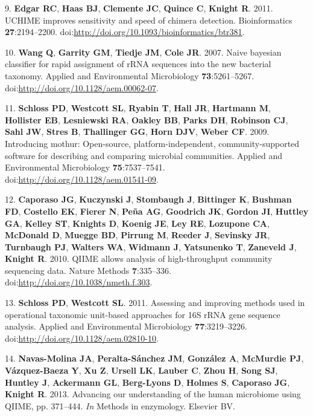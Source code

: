 \documentclass[11pt,]{article}
\begin{document}
9. \textbf{Edgar RC}, \textbf{Haas BJ}, \textbf{Clemente JC},
\textbf{Quince C}, \textbf{Knight R}. 2011. UCHIME improves sensitivity
and speed of chimera detection. Bioinformatics \textbf{27}:2194--2200.
doi:\url{http://doi.org/10.1093/bioinformatics/btr381}.

10. \textbf{Wang Q}, \textbf{Garrity GM}, \textbf{Tiedje JM},
\textbf{Cole JR}. 2007. Naive bayesian classifier for rapid assignment
of rRNA sequences into the new bacterial taxonomy. Applied and
Environmental Microbiology \textbf{73}:5261--5267.
doi:\url{http://doi.org/10.1128/aem.00062-07}.

11. \textbf{Schloss PD}, \textbf{Westcott SL}, \textbf{Ryabin T},
\textbf{Hall JR}, \textbf{Hartmann M}, \textbf{Hollister EB},
\textbf{Lesniewski RA}, \textbf{Oakley BB}, \textbf{Parks DH},
\textbf{Robinson CJ}, \textbf{Sahl JW}, \textbf{Stres B},
\textbf{Thallinger GG}, \textbf{Horn DJV}, \textbf{Weber CF}. 2009.
Introducing mothur: Open-source, platform-independent,
community-supported software for describing and comparing microbial
communities. Applied and Environmental Microbiology
\textbf{75}:7537--7541. doi:\url{http://doi.org/10.1128/aem.01541-09}.

12. \textbf{Caporaso JG}, \textbf{Kuczynski J}, \textbf{Stombaugh J},
\textbf{Bittinger K}, \textbf{Bushman FD}, \textbf{Costello EK},
\textbf{Fierer N}, \textbf{Peña AG}, \textbf{Goodrich JK},
\textbf{Gordon JI}, \textbf{Huttley GA}, \textbf{Kelley ST},
\textbf{Knights D}, \textbf{Koenig JE}, \textbf{Ley RE},
\textbf{Lozupone CA}, \textbf{McDonald D}, \textbf{Muegge BD},
\textbf{Pirrung M}, \textbf{Reeder J}, \textbf{Sevinsky JR},
\textbf{Turnbaugh PJ}, \textbf{Walters WA}, \textbf{Widmann J},
\textbf{Yatsunenko T}, \textbf{Zaneveld J}, \textbf{Knight R}. 2010.
QIIME allows analysis of high-throughput community sequencing data.
Nature Methods \textbf{7}:335--336.
doi:\url{http://doi.org/10.1038/nmeth.f.303}.

13. \textbf{Schloss PD}, \textbf{Westcott SL}. 2011. Assessing and
improving methods used in operational taxonomic unit-based approaches
for 16S rRNA gene sequence analysis. Applied and Environmental
Microbiology \textbf{77}:3219--3226.
doi:\url{http://doi.org/10.1128/aem.02810-10}.

14. \textbf{Navas-Molina JA}, \textbf{Peralta-Sánchez JM},
\textbf{González A}, \textbf{McMurdie PJ}, \textbf{Vázquez-Baeza Y},
\textbf{Xu Z}, \textbf{Ursell LK}, \textbf{Lauber C}, \textbf{Zhou H},
\textbf{Song SJ}, \textbf{Huntley J}, \textbf{Ackermann GL},
\textbf{Berg-Lyons D}, \textbf{Holmes S}, \textbf{Caporaso JG},
\textbf{Knight R}. 2013. Advancing our understanding of the human
microbiome using QIIME, pp. 371--444. \emph{In} Methods in enzymology.
Elsevier BV.
\end{document}
